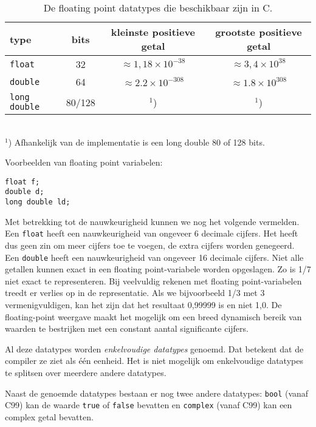 \begin{table}[!ht]
\centering
\caption{De floating point datatypes die beschikbaar zijn in C.}
\label{tab:varfloatdatatypes}
\begin{tabular}{@{}lccc@{}}
\toprule
\textbf{type}          & \textbf{bits} & \textbf{kleinste positieve getal} &  \textbf{grootste positieve getal} \\ \midrule
\texttt{float}         & 32                      & $\approx1,18\times10^{-38}$ & $\approx3,4\times10^{38}$  \\
\texttt{double   }     & 64                      & $\approx2.2\times10^{-308}$ & $\approx1.8\times10^{308}$ \\
\texttt{long double}   & 80/128                      & $^1$) & $^1$)  \\
\bottomrule
\end{tabular}\\\vspace*{1mm}
\footnotesize$^1$) Afhankelijk van de implementatie is een long double 80 of 128 bits.
\end{table}

Voorbeelden van floating point variabelen:

\begin{lstlisting}[style=lstoneline]
float f;
double d;
long double ld;
\end{lstlisting}

Met betrekking tot de nauwkeurigheid kunnen we nog het volgende vermelden. Een \texttt{float} heeft een nauwkeurigheid van ongeveer 6 decimale cijfers. Het heeft dus geen zin om meer cijfers toe te voegen, de extra cijfers worden genegeerd. Een \texttt{double} heeft een nauwkeurigheid van ongeveer 16 decimale cijfers. Niet alle getallen kunnen exact in een floating point-variabele worden opgeslagen. Zo is 1/7 niet exact te representeren. Bij veelvuldig rekenen met floating point-variabelen treedt er verlies op in de representatie. Als we bijvoorbeeld 1/3 met 3 vermenigvuldigen, kan het zijn dat het resultaat 0,99999 is en niet 1,0. De floating-point weergave maakt het mogelijk om een breed dynamisch bereik van waarden te bestrijken met een constant aantal significante cijfers.

Al deze datatypes worden \textsl{enkelvoudige datatypes} genoemd. Dat betekent dat de compiler ze ziet als één eenheid. Het is niet mogelijk om enkelvoudige datatypes te splitsen over meerdere andere datatypes.

Naast de genoemde datatypes bestaan er nog twee andere datatypes: \texttt{bool} (vanaf C99) kan de waarde \texttt{true} of \texttt{false} bevatten en \texttt{complex} (vanaf C99) kan een complex getal bevatten.

